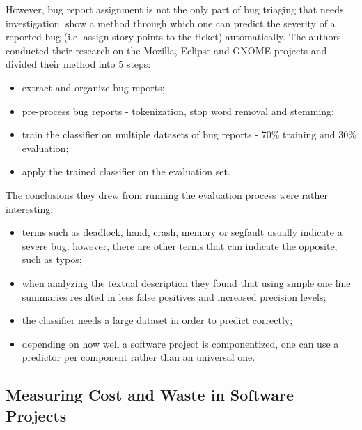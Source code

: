 \documentclass{mprop}
\begin{document}
However, bug report assignment is not the only part of bug triaging that needs
investigation. \citet{lamkanfi2010predicting} show a method through which one
can predict the severity of a reported bug (i.e. assign story points to the 
ticket) automatically. The authors conducted their research on the Mozilla,
Eclipse and GNOME projects and divided their method into 5 steps:
  \begin{itemize}
    \item extract and organize bug reports;
    \item pre-process bug reports - tokenization, stop word removal and stemming;
    \item train the classifier on multiple datasets of bug reports - 70\% 
      training and 30\% evaluation;
    \item apply the trained classifier on the evaluation set.
  \end{itemize}
The conclusions they drew from running the evaluation process were rather 
interesting:
  \begin{itemize}
    \item terms such as deadlock, hand, crash, memory or segfault usually indicate
      a severe bug; however, there are other terms that can indicate the opposite,
      such as typos;
    \item when analyzing the textual description they found that using simple
      one line summaries resulted in less false positives and increased precision
      levels;
    \item the classifier needs a large dataset in order to predict correctly;
    \item depending on how well a software project is componentized, one can 
      use a predictor per component rather than an universal one.
  \end{itemize}

\subsection{Measuring Cost and Waste in Software Projects}
\end{document}
